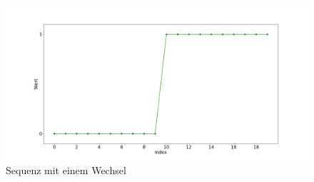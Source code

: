 \begin{figure}[H]
	\centering
		\includegraphics[scale=0.32]{images/Klassifizierung/wechsel}
	\caption{Sequenz mit einem Wechsel}
	\label{fig:wechsel}
\end{figure}